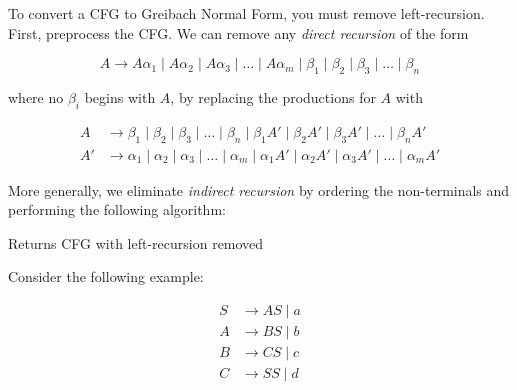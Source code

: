 To convert a CFG to Greibach Normal Form, you must remove left-recursion. First, preprocess the CFG\@. We can remove any \textit{direct recursion} of the form 

\[A\to A\alpha_1 \mid A\alpha_2 \mid A\alpha_3 \mid \hdots \mid A\alpha_m \mid \beta_1 \mid \beta_2 \mid \beta_3 \mid \hdots \mid \beta_n\] 

where no \(\beta_i\) begins with \(A\), by replacing the productions for \(A\) with 

\begin{align*}
    A  &\to \beta_1\mid \beta_2\mid \beta_3\mid \hdots \mid \beta_n\mid\beta_1 A'\mid \beta_2 A'\mid \beta_3 A'\mid \hdots \mid \beta_n A'\\
    A' &\to \alpha_1\mid \alpha_2\mid \alpha_3\mid \hdots \mid \alpha_m\mid \alpha_1 A'\mid \alpha_2 A'\mid \alpha_3 A' \mid \hdots \mid \alpha_m A'
\end{align*}

More generally, we eliminate \textit{indirect recursion} by ordering the non-terminals and performing the following algorithm:

\begin{algorithm}[H]
    \renewcommand{\thealgorithm}{}
    \caption{Returns CFG with left-recursion removed}\label{remove-left-recursion}
    \begin{algorithmic}[1]
                    \EndFor{}
                \EndIf{}
            \EndFor{}
        \EndFor{}
    \EndProcedure{}
    \end{algorithmic}
    \end{algorithm}

Consider the following example:

\begin{align*}
    S &\to AS\mid a\\
    A &\to BS\mid b\\
    B &\to CS\mid c\\
    C &\to SS\mid d
\end{align*}

